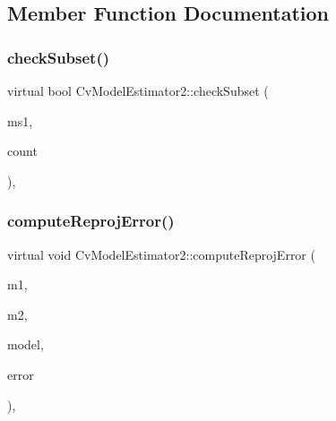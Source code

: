 \subsection{Member Function Documentation}
\mbox{\label{class_cv_model_estimator2_ae149bd480d9b445c66b1c34a351cbb5a}} 
\subsubsection{check\+Subset()}
{\footnotesize\ttfamily virtual bool Cv\+Model\+Estimator2\+::check\+Subset (\begin{DoxyParamCaption}\item[{const Cv\+Mat $\ast$}]{ms1,  }\item[{int}]{count }\end{DoxyParamCaption})\hspace{0.3cm}{\ttfamily [protected]}, {\ttfamily [virtual]}}

\mbox{\label{class_cv_model_estimator2_ae2aa4bbc11e6fc303d81b95daf2795ad}} 
\subsubsection{compute\+Reproj\+Error()}
{\footnotesize\ttfamily virtual void Cv\+Model\+Estimator2\+::compute\+Reproj\+Error (\begin{DoxyParamCaption}\item[{const Cv\+Mat $\ast$}]{m1,  }\item[{const Cv\+Mat $\ast$}]{m2,  }\item[{const Cv\+Mat $\ast$}]{model,  }\item[{Cv\+Mat $\ast$}]{error }\end{DoxyParamCaption})\hspace{0.3cm}{\ttfamily [protected]}, {}}

\mbox{\label{class_cv_model_estimator2_a7683a8352f66ba994982493690f418b1}} 

